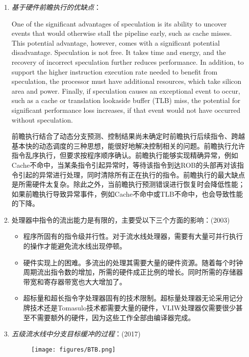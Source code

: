 \documentclass[a4paper]{ctexbook}
\begin{document}
\begin{enumerate}
  
  \item \emph{基于硬件前瞻执行的优缺点}：
  
  One of the significant advantages of speculation is its ability to uncover events that would otherwise stall the pipeline early, such as cache misses. This potential advantage, however, comes with a significant potential disadvantage. Speculation is not free. It takes time and energy, and the recovery of incorrect speculation further reduces performance. In addition, to support the higher instruction execution rate needed to benefit from speculation, the processor must have additional resources, which take silicon area and power. Finally, if speculation causes an exceptional event to occur, such as a cache or translation lookaside buffer (TLB) miss, the potential for significant performance loss increases, if that event would not have occurred without speculation. 
  
  前瞻执行结合了动态分支预测、控制结果尚未确定时前瞻执行后续指令、跨越基本快的动态调度的三种思想，能很好地解决控制相关的问题。前瞻执行允许指令乱序执行，但要求按程序顺序确认。前瞻执行能够实现精确异常，例如Cache不命中，当某条指令引起异常时，等待该指令到达ROB的头部再对该指令引起的异常进行处理，同时清除所有正在执行的指令。前瞻执行的最大缺点是所需硬件太复杂。除此之外，当前瞻执行预测错误进行恢复时会降低性能；如果前瞻执行导致异常事件，例如Cache不命中或TLB不命中，也会导致性能的下降。

  \item 处理器中指令的流出能力是有限的，主要受以下三个方面的影响：(2003)
  \begin{itemize}
    \item 程序所固有的指令级并行性。对于流水线处理器，需要有大量可并行执行的操作才能避免流水线出现停顿。
    \item 硬件实现上的困难。多流出的处理其需要大量的硬件资源。随着每个时钟周期流出指令数的增加，所需的硬件成正比例的增长。同时所需的存储器带宽和寄存器带宽也大大增加了。
    \item 超标量和超长指令字处理器固有的技术限制。超标量处理器无论采用记分牌技术还是Tomasulo技术都需要大量的硬件，VLIW处理器仅需要很少甚至不需要额外的硬件，因为这些工作全部由编译器完成。
  \end{itemize}

  \item \emph{五级流水线中分支目标缓冲的过程}：(2017)
  \begin{figure}[H]
    \centering
    \texttt{[image: figures/BTB.png]}
  \end{figure}
  

\end{enumerate}
\end{document}
